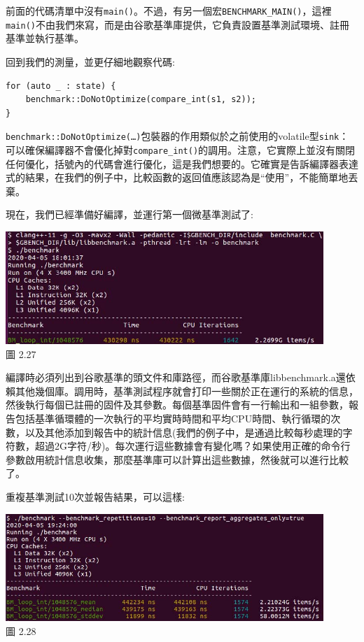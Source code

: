前面的代碼清單中沒有\texttt{main()}。不過，有另一個宏\texttt{BENCHMARK\_MAIN()}，這裡\texttt{main()}不由我們來寫，而是由谷歌基準庫提供，它負責設置基準測試環境、註冊基準並執行基準。

回到我們的測量，並更仔細地觀察代碼:

\begin{lstlisting}[style=styleCXX]
for (auto _ : state) {
	benchmark::DoNotOptimize(compare_int(s1, s2));
}
\end{lstlisting}

\texttt{benchmark::DoNotOptimize(…)}包裝器的作用類似於之前使用的volatile型\texttt{sink}：可以確保編譯器不會優化掉對\texttt{compare\_int()}的調用。注意，它實際上並沒有關閉任何優化，括號內的代碼會進行優化，這是我們想要的。它確實是告訴編譯器表達式的結果，在我們的例子中，比較函數的返回值應該認為是“使用”，不能簡單地丟棄。

現在，我們已經準備好編譯，並運行第一個微基準測試了:

\begin{center}
\includegraphics[width=0.9\textwidth]{content/1/chapter2/images/27.jpg}\\
圖 2.27
\end{center}

編譯時必須列出到谷歌基準的頭文件和庫路徑，而谷歌基準庫libbenchmark.a還依賴其他幾個庫。調用時，基準測試程序就會打印一些關於正在運行的系統的信息，然後執行每個已註冊的固件及其參數。每個基準固件會有一行輸出和一組參數，報告包括基準循環體的一次執行的平均實時時間和平均CPU時間、執行循環的次數，以及其他添加到報告中的統計信息(我們的例子中，是通過比較每秒處理的字符數，超過2G字符/秒)。每次運行這些數據會有變化嗎？如果使用正確的命令行參數啟用統計信息收集，那麼基準庫可以計算出這些數據，然後就可以進行比較了。

重複基準測試10次並報告結果，可以這樣:

\begin{center}
\includegraphics[width=0.9\textwidth]{content/1/chapter2/images/28.jpg}\\
圖 2.28
\end{center}

